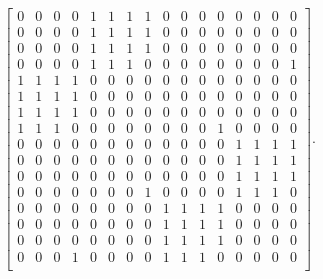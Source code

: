 \begin{primer}
    \begin{align*}
        \begin{bmatrix}
            0 & 0 & 0 & 0 & 1 & 1 & 1 & 1 & 0 & 0 & 0 & 0 & 0 & 0 & 0 & 0\\
            0 & 0 & 0 & 0 & 1 & 1 & 1 & 1 & 0 & 0 & 0 & 0 & 0 & 0 & 0 & 0\\
            0 & 0 & 0 & 0 & 1 & 1 & 1 & 1 & 0 & 0 & 0 & 0 & 0 & 0 & 0 & 0\\
            0 & 0 & 0 & 0 & 1 & 1 & 1 & 0 & 0 & 0 & 0 & 0 & 0 & 0 & 0 & 1\\
            1 & 1 & 1 & 1 & 0 & 0 & 0 & 0 & 0 & 0 & 0 & 0 & 0 & 0 & 0 & 0\\
            1 & 1 & 1 & 1 & 0 & 0 & 0 & 0 & 0 & 0 & 0 & 0 & 0 & 0 & 0 & 0\\
            1 & 1 & 1 & 1 & 0 & 0 & 0 & 0 & 0 & 0 & 0 & 0 & 0 & 0 & 0 & 0\\
            1 & 1 & 1 & 0 & 0 & 0 & 0 & 0 & 0 & 0 & 0 & 1 & 0 & 0 & 0 & 0\\
            0 & 0 & 0 & 0 & 0 & 0 & 0 & 0 & 0 & 0 & 0 & 0 & 1 & 1 & 1 & 1\\
            0 & 0 & 0 & 0 & 0 & 0 & 0 & 0 & 0 & 0 & 0 & 0 & 1 & 1 & 1 & 1\\
            0 & 0 & 0 & 0 & 0 & 0 & 0 & 0 & 0 & 0 & 0 & 0 & 1 & 1 & 1 & 1\\
            0 & 0 & 0 & 0 & 0 & 0 & 0 & 1 & 0 & 0 & 0 & 0 & 1 & 1 & 1 & 0\\
            0 & 0 & 0 & 0 & 0 & 0 & 0 & 0 & 1 & 1 & 1 & 1 & 0 & 0 & 0 & 0\\
            0 & 0 & 0 & 0 & 0 & 0 & 0 & 0 & 1 & 1 & 1 & 1 & 0 & 0 & 0 & 0\\
            0 & 0 & 0 & 0 & 0 & 0 & 0 & 0 & 1 & 1 & 1 & 1 & 0 & 0 & 0 & 0\\
            0 & 0 & 0 & 1 & 0 & 0 & 0 & 0 & 1 & 1 & 1 & 0 & 0 & 0 & 0 & 0\\
    \end{bmatrix}.
    \end{align*}
    \begin{figure}[H]
        \centering
\end{figure}
\end{primer}
